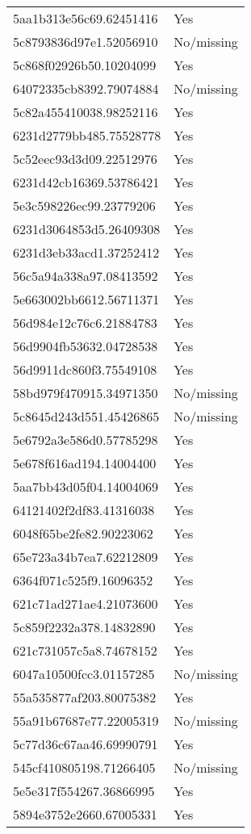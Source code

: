\begin{tabular}{ll}
5aa1b313e56c69.62451416 & Yes \\
5c8793836d97e1.52056910 & No/missing \\
5c868f02926b50.10204099 & Yes \\
64072335cb8392.79074884 & No/missing \\
5c82a455410038.98252116 & Yes \\
6231d2779bb485.75528778 & Yes \\
5c52eec93d3d09.22512976 & Yes \\
6231d42cb16369.53786421 & Yes \\
5e3c598226ec99.23779206 & Yes \\
6231d3064853d5.26409308 & Yes \\
6231d3eb33acd1.37252412 & Yes \\
56c5a94a338a97.08413592 & Yes \\
5e663002bb6612.56711371 & Yes \\
56d984e12c76c6.21884783 & Yes \\
56d9904fb53632.04728538 & Yes \\
56d9911dc860f3.75549108 & Yes \\
58bd979f470915.34971350 & No/missing \\
5c8645d243d551.45426865 & No/missing \\
5e6792a3e586d0.57785298 & Yes \\
5e678f616ad194.14004400 & Yes \\
5aa7bb43d05f04.14004069 & Yes \\
64121402f2df83.41316038 & Yes \\
6048f65be2fe82.90223062 & Yes \\
65e723a34b7ea7.62212809 & Yes \\
6364f071c525f9.16096352 & Yes \\
621c71ad271ae4.21073600 & Yes \\
5c859f2232a378.14832890 & Yes \\
621c731057c5a8.74678152 & Yes \\
6047a10500fcc3.01157285 & No/missing \\
55a535877af203.80075382 & Yes \\
55a91b67687e77.22005319 & No/missing \\
5c77d36c67aa46.69990791 & Yes \\
545cf410805198.71266405 & No/missing \\
5e5e317f554267.36866995 & Yes \\
5894e3752e2660.67005331 & Yes \\

\end{tabular}
